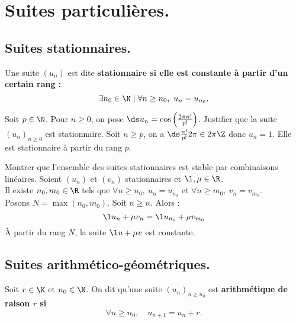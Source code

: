 \documentclass[11pt]{article}
\begin{document}
\section{Suites particulières.}

\subsection{Suites stationnaires.}

\begin{defi}{}{}
    Une suite $(u_n)$ est dite \bf{stationnaire} si elle est constante à partir d'un certain rang :
    \begin{equation*}
        \exists n_0 \in \N \mid \forall n \geq n_0, ~ u_n = u_{n_0}.
    \end{equation*}
\end{defi}

\begin{ex}{}{}
    Soit $p\in\N$. Pour $n\geq0$, on pose $\ds u_n=\cos\left( \frac{2\pi n!}{p!} \right)$. Justifier que la suite $(u_n)_{n\geq0}$ est stationnaire.
    \tcblower
    Soit $n\geq p$, on a $\ds\frac{n!}{p!}2\pi \in 2\pi\Z$ donc $u_n=1$. Elle est stationnaire à partir du rang $p$.
\end{ex}

\begin{ex}{}{}
    Montrer que l'ensemble des suites stationnaires est stable par combinaisons linéaires.
    \tcblower
    Soient $(u_n)$ et $(v_n)$ stationnaires et $\l,\mu\in\R$.\\
    Il existe $n_0,m_0\in\R$ tels que $\forall n \geq n_0, ~ u_n = u_{n_0}$ et $\forall n \geq m_0, ~ v_n = v_{m_0}$.\\
    Posons $N=\max(n_0,m_0)$. Soit $n\geq n$. Alors :
    \begin{equation*}
        \l u_n + \mu v_n = \l u_{n_0} + \mu v_{m_0}
    \end{equation*}
    À partir du rang $N$, la suite $\l u + \mu v$ est constante.
\end{ex}

\subsection{Suites arithmético-géométriques.}

\begin{defi}{}{}
    Soit $r\in\K$ et $n_0\in\N$. On dit qu'une suite $(u_n)_{n\geq n_0}$ est \bf{arithmétique} de raison $r$ si
    \begin{equation*}
        \forall n\geq n_0, \quad u_{n+1} = u_n + r.
    \end{equation*}
\end{defi}
\end{document}

